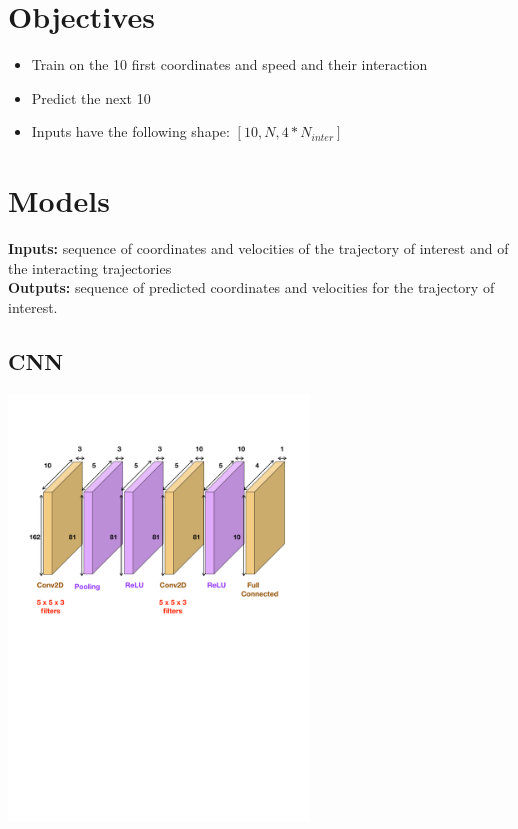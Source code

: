 \documentclass[a0,portrait]{a0poster}
\begin{document}
\begin{multicols}{2}
\section*{Objectives}

\begin{itemize}
\item Train on the 10 first coordinates and speed and their interaction
\item Predict the next 10 
\item Inputs have the following shape: $[10,N,4 * N_{inter}]$ 
\end{itemize}


\section*{Models}
\textbf{Inputs:} sequence of coordinates and velocities of the trajectory of interest and of the interacting trajectories\\
\textbf{Outputs:} sequence of predicted coordinates and velocities for the trajectory of interest.\\

\begin{minipage}[]{0.5\linewidth}
\subsection*{CNN}
\centerline {\includegraphics[width=0.6\textwidth]{figure/CNN}}
\vspace{3cm}
\end{minipage}
\hfill
\begin{minipage}[]{0.5\linewidth}

\end{minipage}
\end{multicols}
\end{document}
